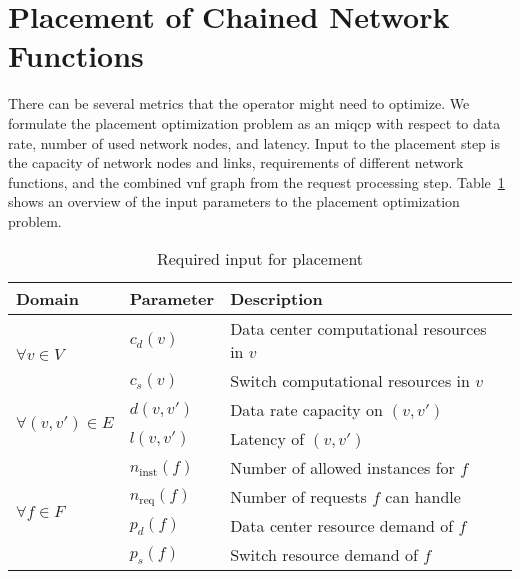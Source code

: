 \documentclass[10pt,a4paper,conference]{IEEEtran}
\begin{document}
\section{Placement of Chained Network Functions}
\label{sec:placement}

There can be several
metrics that the operator might need to optimize. We formulate the placement
optimization problem as an \ac{miqcp} with respect to data rate, number 
of used network nodes, and latency. Input to the placement step is the capacity
of network nodes and links, requirements of different network functions, and the
combined \ac{vnf} graph from the request processing step. Table~\ref{table:placementparams}
shows an overview of the input parameters to the placement optimization problem.


\begin{table}[!t]
\caption{Required input for placement}
\label{table:placementparams}
\centering
\begin{tabular}{lll}
\hline
Domain                                                   & Parameter               & Description                         \\ \hline\hline
\multirow{2}{*}{$ \forall v {\in} V $}                     & $ c_d(v) $              & Data center computational resources in $ v $          \\  
\multicolumn{1}{l}{}                                   & $ c_s(v)$               & Switch computational resources in $ v $              \\ \hline
\multirow{2}{*}{$ \forall (v,v') {\in} E $}                & $ d(v,v') $             & Data rate capacity on $ (v,v') $                          \\  
                                                         & $ l(v,v') $             & Latency of $ (v,v') $                                       \\ \hline
\multirow{4}{*}{$ \forall f {\in} F $}                     & $ n_\text{inst}(f) $    & Number of allowed instances for $ f $                 \\  
                                                         & $ n_\text{req}(f) $     & Number of requests $ f $ can handle       \\  
                                                         & $ p_d(f) $              & Data center resource demand of $ f $    \\  
                                                         & $ p_s(f) $              & Switch resource demand of $ f $        \\ \hline

\end{tabular}
\end{table}
\end{document}
